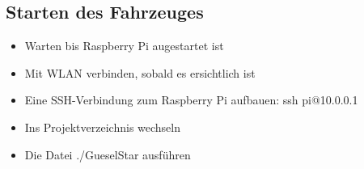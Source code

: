 \subsection{Starten des Fahrzeuges}
\begin{itemize}
\item Warten bis Raspberry Pi augestartet ist
\item Mit WLAN verbinden, sobald es ersichtlich ist
\item Eine SSH-Verbindung zum Raspberry Pi aufbauen: ssh pi@10.0.0.1
\item Ins Projektverzeichnis wechseln
\item Die Datei ./GueselStar ausführen
\end{itemize}

